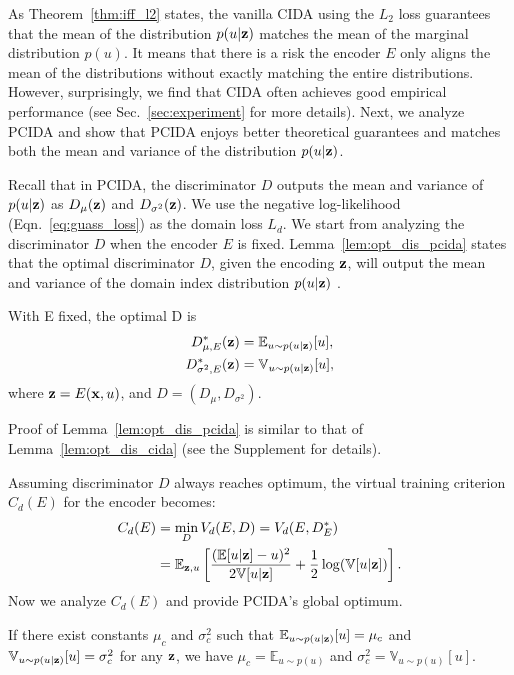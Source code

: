 \documentclass{article}
\newcommand{\secref}[1]{Sec.~\ref{#1}}
\newcommand{\lemref}[1]{Lemma~\ref{#1}}
\newcommand{\thmref}[1]{Theorem~\ref{#1}}
\newcommand{\eqnref}[1]{Eqn.~\ref{#1}}
\begin{document}
As \thmref{thm:iff_l2} states, the vanilla CIDA using the $L_2$ loss guarantees that the mean of the distribution $p(u| {\bf z})$ matches the mean of the marginal distribution $p(u)$.
It means that there is a risk the encoder $E$ only aligns the mean of the distributions without exactly matching the entire distributions. However, surprisingly, we find that CIDA often achieves good empirical performance (see \secref{sec:experiment} for more details). Next, we analyze PCIDA and show that PCIDA enjoys better theoretical guarantees and matches both the mean and variance of the distribution $p(u|{\bf z})$.



Recall that in PCIDA, the discriminator $D$ outputs the mean and variance of $p(u|{\bf z})$ as $D_{\mu}({\bf z})$ and $D_{\sigma^2}({\bf z})$. We use the negative log-likelihood (\eqnref{eq:guass_loss}) as the domain loss $L_d$. We start from analyzing the discriminator $D$ when the encoder $E$ is fixed. \lemref{lem:opt_dis_pcida} states that the optimal discriminator $D$, given the encoding ${\bf z}$, will output the mean and variance of the domain index distribution $p(u | {\bf z})$ .

\begin{lemma}\label{lem:opt_dis_pcida} With E fixed, the optimal D is
\begin{align*}
D^*_{{\mu},E}({\bf z}) &= \mathbb{E}_{u\sim p(u | {\bf z})} [u],\\
D^*_{{\sigma^2},E}({\bf z}) &= \mathbb{V}_{u\sim p(u | {\bf z})} [u],
\end{align*}
where ${\bf z}=E({\bf x},u)$, and $D=(D_{\mu}, D_{\sigma^2})$.
\end{lemma}
Proof of \lemref{lem:opt_dis_pcida} is similar to that of \lemref{lem:opt_dis_cida} (see the Supplement for details).


Assuming discriminator $D$ always reaches optimum, the virtual training criterion $C_d(E)$ for the encoder becomes:
\begin{align*}
C_d(E) &= \min\limits_D V_d(E,D) \nonumber = V_d(E,D^*_E)\\
&= {\mathbb E}_{{\bf z},u} \left[\frac{({\mathbb E}[u|{\bf z}] - u)^2}{2{\mathbb V}[u|{\bf z}]} + \frac{1}{2} \log({\mathbb V}[u|{\bf z}]) \right].
\end{align*}
Now we analyze $C_d(E)$ and provide PCIDA's global optimum.

\begin{lemma}\label{lem:unique}
If there exist constants $\mu_c$ and $\sigma_c^2$ such that $\mathbb{E}_{u\sim p(u | {\bf z})}[u] = \mu_c$ and $\mathbb{V}_{u\sim p(u | {\bf z})}[u] = \sigma_c^2$ for any ${\bf z}$, we have $\mu_c = \mathbb{E}_{u\sim p(u)}$ and $\sigma_c^2 = \mathbb{V}_{u\sim p(u)}[u]$.
\end{lemma}
\end{document}
